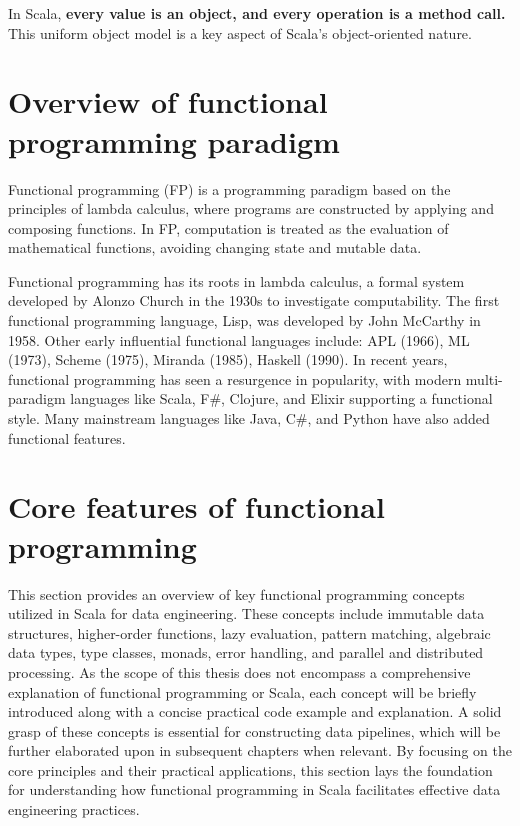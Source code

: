 In Scala, \textbf{every value is an object, and every operation is a method call.} This uniform object model is a key aspect of Scala's object-oriented nature.\footnotemark[3]


\section{Overview of functional programming paradigm}

Functional programming (FP) is a programming paradigm based on the principles of lambda calculus, where programs are constructed by applying and composing functions.  In FP, computation is treated as the evaluation of mathematical functions, avoiding changing state and mutable data.\footnotemark {}

Functional programming has its roots in lambda calculus, a formal system developed by Alonzo Church in the 1930s to investigate computability. The first functional programming language, Lisp, was developed by John McCarthy in 1958. Other early influential functional languages include: APL (1966), ML (1973), Scheme (1975), Miranda (1985), Haskell (1990). In recent years, functional programming has seen a resurgence in popularity, with modern multi-paradigm languages like Scala, F\#, Clojure, and Elixir supporting a functional style. Many mainstream languages like Java, C\#, and Python have also added functional features. \footnotemark {}

\section{Core features of functional programming}

This section provides an overview of key functional programming concepts utilized in Scala for data engineering. These concepts include immutable data structures, higher-order functions, lazy evaluation, pattern matching, algebraic data types, type classes, monads, error handling, and parallel and distributed processing. As the scope of this thesis does not encompass a comprehensive explanation of functional programming or Scala, each concept will be briefly introduced along with a concise practical code example and explanation. A solid grasp of these concepts is essential for constructing data pipelines, which will be further elaborated upon in subsequent chapters when relevant. By focusing on the core principles and their practical applications, this section lays the foundation for understanding how functional programming in Scala facilitates effective data engineering practices.

